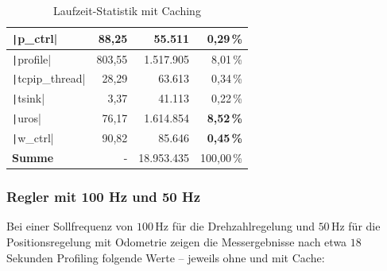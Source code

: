\begin{table}[H]
{{\begin{minipage}[b]{0.50\hsize}
\begin{tabular}{|l|r|r|r|}
        \texttt|p_ctrl| & 88,25 & 55.511 & \textbf{0,29\,\%} \\ \hline
        \texttt|profile| & 803,55 & 1.517.905 & 8,01\,\% \\ \hline
        \texttt|tcpip_thread| & 28,29 & 63.613 & 0,34\,\% \\ \hline
        \texttt|tsink| & 3,37 & 41.113 & 0,22\,\% \\ \hline
        \texttt|uros| & 76,17 & 1.614.854 & \textbf{8,52\,\%} \\ \hline
        \texttt|w_ctrl| & 90,82 & 85.646 & \textbf{0,45\,\%} \\ \hline
        \hline
        \textbf{Summe} & - & 18.953.435 & 100,00\,\% \\ \hline
        \end{tabular}
        \caption{Laufzeit-Statistik mit Caching}
    \end{minipage}
}}
\end{table}

\subsubsection{Regler mit 100 Hz und 50 Hz}

Bei einer Sollfrequenz von $100\,\text{Hz}$ für die Drehzahlregelung und
$50\,\text{Hz}$ für die Positionsregelung mit Odometrie zeigen die
Messergebnisse nach etwa $18$ Sekunden Profiling folgende Werte -- jeweils ohne
und mit Cache:

